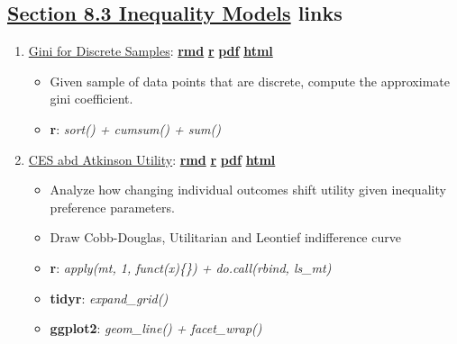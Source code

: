 \documentclass[
]{book}
\providecommand{\tightlist}{%
  \setlength{\itemsep}{0pt}\setlength{\parskip}{0pt}}
\begin{document}
\hypertarget{section-8.3-inequality-modelsinequality-models-links}{%
\subsection{\texorpdfstring{\protect\hyperlink{inequality-models}{Section 8.3 Inequality Models} links}{Section 8.3 Inequality Models links}}\label{section-8.3-inequality-modelsinequality-models-links}}

\begin{enumerate}
\def\labelenumi{\arabic{enumi}.}
\tightlist
\item
  \href{https://fanwangecon.github.io/R4Econ/math/func_ineq/htmlpdfr/fs_gini_disc.html}{Gini for Discrete Samples}: \href{https://github.com/FanWangEcon/R4Econ/blob/master/math/func_ineq//fs_gini_disc.Rmd}{\textbf{rmd}} \textbar{} \href{https://github.com/FanWangEcon/R4Econ/blob/master/math/func_ineq/htmlpdfr/fs_gini_disc.R}{\textbf{r}} \textbar{} \href{https://github.com/FanWangEcon/R4Econ/blob/master/math/func_ineq/htmlpdfr/fs_gini_disc.pdf}{\textbf{pdf}} \textbar{} \href{https://fanwangecon.github.io/R4Econ/math/func_ineq/htmlpdfr/fs_gini_disc.html}{\textbf{html}}

  \begin{itemize}
  \tightlist
  \item
    Given sample of data points that are discrete, compute the approximate gini coefficient.
  \item
    \textbf{r}: \emph{sort() + cumsum() + sum()}
  \end{itemize}
\item
  \href{https://fanwangecon.github.io/R4Econ/math/func_ineq/htmlpdfr/fs_atkinson_ces.html}{CES abd Atkinson Utility}: \href{https://github.com/FanWangEcon/R4Econ/blob/master/math/func_ineq//fs_atkinson_ces.Rmd}{\textbf{rmd}} \textbar{} \href{https://github.com/FanWangEcon/R4Econ/blob/master/math/func_ineq/htmlpdfr/fs_atkinson_ces.R}{\textbf{r}} \textbar{} \href{https://github.com/FanWangEcon/R4Econ/blob/master/math/func_ineq/htmlpdfr/fs_atkinson_ces.pdf}{\textbf{pdf}} \textbar{} \href{https://fanwangecon.github.io/R4Econ/math/func_ineq/htmlpdfr/fs_atkinson_ces.html}{\textbf{html}}

  \begin{itemize}
  \tightlist
  \item
    Analyze how changing individual outcomes shift utility given inequality preference parameters.
  \item
    Draw Cobb-Douglas, Utilitarian and Leontief indifference curve
  \item
    \textbf{r}: \emph{apply(mt, 1, funct(x)\{\}) + do.call(rbind, ls\_mt)}
  \item
    \textbf{tidyr}: \emph{expand\_grid()}
  \item
    \textbf{ggplot2}: \emph{geom\_line() + facet\_wrap()}
  \end{itemize}
\end{enumerate}
\end{document}
